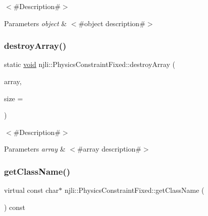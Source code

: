 $<$\#\+Description\#$>$


\begin{DoxyParams}{Parameters}
{\em object} & $<$\#object description\#$>$ \\
\hline
\end{DoxyParams}
\mbox{\label{classnjli_1_1_physics_constraint_fixed_a2d9b9e229cb4b85b1143f0e3be7249dd}} 
\subsubsection{\texorpdfstring{destroy\+Array()}{destroyArray()}}
{\footnotesize\ttfamily static \mbox{\hyperlink{_thread_8h_af1e856da2e658414cb2456cb6f7ebc66}{void}} njli\+::\+Physics\+Constraint\+Fixed\+::destroy\+Array (\begin{DoxyParamCaption}\item[{\mbox{\hyperlink{classnjli_1_1_physics_constraint_fixed}{Physics\+Constraint\+Fixed}} $\ast$$\ast$}]{array,  }\item[{const \mbox{\hyperlink{_util_8h_a10e94b422ef0c20dcdec20d31a1f5049}{u32}}}]{size = {} }\end{DoxyParamCaption})\hspace{0.3cm}{\ttfamily [static]}}

$<$\#\+Description\#$>$


\begin{DoxyParams}{Parameters}
{\em array} & $<$\#array description\#$>$ \\
\hline
\end{DoxyParams}
\mbox{\label{classnjli_1_1_physics_constraint_fixed_ae6b9c4224d1dcc599a396385664b0ba0}} 
\subsubsection{\texorpdfstring{get\+Class\+Name()}{getClassName()}}
{\footnotesize\ttfamily virtual const char$\ast$ njli\+::\+Physics\+Constraint\+Fixed\+::get\+Class\+Name (\begin{DoxyParamCaption}{ }\end{DoxyParamCaption}) const\hspace{0.3cm}{\ttfamily [virtual]}}

